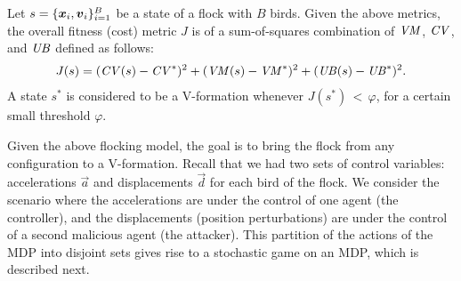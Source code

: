 \noindent{}Let $s=\{{\boldsymbol {x}}_i, {\boldsymbol {v}}_i\}_{i=1}^B$ be a state of a flock with $B$ birds. Given the above metrics, the overall fitness (cost) metric $J$ 
is of a sum-of-squares combination of ${\it VM}$, ${\it CV}$, and ${\it UB}$ defined as follows:
\vspace*{-1mm}
\begin{align}
J(s) = ({\it CV}(s)-{\it CV}^*)^2 + ({\it VM}(s)-{\it VM}^*)^2 +({\it UB}(s)-{\it UB}^*)^2.
\label{eq:fitness}
\end{align}
A state $s^{*}$ is considered to be a V-formation whenever $J(s^{*})\,{<}\,\varphi$, for a certain small threshold $\varphi$.

Given the above flocking model, the goal is to bring the flock from any configuration to a V-formation. Recall that we had two sets of control variables: accelerations $\vec{a}$ and displacements $\vec{d}$ for each bird of the flock.
We consider the scenario where the accelerations are under the control of one agent (the controller), and the displacements (position perturbations) are under the control of a second malicious agent (the attacker). This partition of the actions of the MDP into disjoint sets gives rise to a stochastic game on an MDP, which is described next.